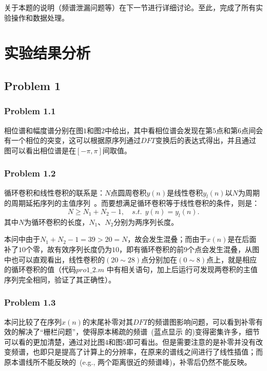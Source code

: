 \documentclass[a4paper,11pt,onecolumn,twoside]{article}
\begin{document}
关于本题的说明（频谱泄漏问题等）在下一节进行详细讨论。至此，完成了所有实验操作和数据处理。

\section{实验结果分析}

\subsection{Problem 1}

\subsubsection{Problem 1.1}
相位谱和幅度谱分别在图$1$和图$2$中给出，其中看相位谱会发现在第$5$点和第$6$点间会有一个相位的突变，这可以根据原序列通过$DFT$变换后的表达式得出，并且通过图可以看出相位谱是在$[-\pi,\pi]$间取值。

\subsubsection{Problem 1.2}
循环卷积和线性卷积的联系是：$N$点圆周卷积$y(n)$是线性卷积$y_l(n)$以$N$为周期的周期延拓序列的主值序列~\supercite{course2}。而要想满足循环卷积等于线性卷积的条件，则是：
\begin{equation}
N \geq N_1+N_2-1, \quad s.t. \ \ y(n) = y_l(n).
\end{equation}
其中$N$为循环卷积的长度，$N_1$、$N_2$分别为两序列长度。

本问中由于$N_1+N_2-1=39>20=N$，故会发生混叠；而由于$x(n)$是在后面补了$10$个零，故有效序列长度仍为$10$，即有循环卷积的前$9$个点会发生混叠，从图中也可以直观看出，线性卷积的$(20\sim 28)$点分别加在$(0\sim 8)$点上，就是相应的循环卷积的值（代码$pro1\_2.m$ 中有相关语句，加上后运行可发现两卷积的主值序列完全相同，验证了其正确性）。

\subsubsection{Problem 1.3}
本问比较了在序列$x(n)$的末尾补零对其$DFT$的频谱图影响问题，可以看到补零有效的解决了``栅栏问题''，使得原本稀疏的频谱~(蓝点显示 的)变得密集许多，细节可以看的更加清楚，通过对比图$4$和图$5$即可看出。但是需要注意的是补零并没有改变频谱，也即只是提高了计算上的分辨率，在原来的谱线之间进行了线性插值；而原本谱线所不能反映的~(e.g., 两个距离很近的频谱峰)，补零后仍然不能反映。
\end{document}

